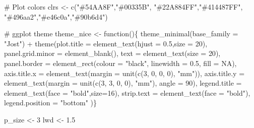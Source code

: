 \documentclass[
  letterpaper,
  DIV=11,
  numbers=noendperiod]{scrartcl}
\newenvironment{Shaded}{\begin{snugshade}}{\end{snugshade}}
\newcommand{\AttributeTok}[1]{\textcolor[rgb]{0.40,0.45,0.13}{#1}}
\newcommand{\CommentTok}[1]{\textcolor[rgb]{0.37,0.37,0.37}{#1}}
\newcommand{\ConstantTok}[1]{\textcolor[rgb]{0.56,0.35,0.01}{#1}}
\newcommand{\ControlFlowTok}[1]{\textcolor[rgb]{0.00,0.23,0.31}{#1}}
\newcommand{\DecValTok}[1]{\textcolor[rgb]{0.68,0.00,0.00}{#1}}
\newcommand{\FloatTok}[1]{\textcolor[rgb]{0.68,0.00,0.00}{#1}}
\newcommand{\FunctionTok}[1]{\textcolor[rgb]{0.28,0.35,0.67}{#1}}
\newcommand{\NormalTok}[1]{\textcolor[rgb]{0.00,0.23,0.31}{#1}}
\newcommand{\OtherTok}[1]{\textcolor[rgb]{0.00,0.23,0.31}{#1}}
\newcommand{\SpecialCharTok}[1]{\textcolor[rgb]{0.37,0.37,0.37}{#1}}
\newcommand{\StringTok}[1]{\textcolor[rgb]{0.13,0.47,0.30}{#1}}
\begin{document}
\begin{Shaded}
\begin{Highlighting}[]
\CommentTok{\# Plot colors}
\NormalTok{clrs }\OtherTok{\textless{}{-}} \FunctionTok{c}\NormalTok{(}\StringTok{"\#54AA8F"}\NormalTok{,}\StringTok{"\#00335B"}\NormalTok{,}
          \StringTok{"\#22A884FF"}\NormalTok{,}\StringTok{"\#414487FF"}\NormalTok{,}
          \StringTok{"\#496aa2"}\NormalTok{,}\StringTok{"\#e46c0a"}\NormalTok{,}\StringTok{"\#90b6d4"}\NormalTok{)}


\CommentTok{\# ggplot theme}
\NormalTok{theme\_nice }\OtherTok{\textless{}{-}} \ControlFlowTok{function}\NormalTok{()\{}
  \FunctionTok{theme\_minimal}\NormalTok{(}\AttributeTok{base\_family =} \StringTok{"Jost"}\NormalTok{) }\SpecialCharTok{+}  
    \FunctionTok{theme}\NormalTok{(}\AttributeTok{plot.title       =} \FunctionTok{element\_text}\NormalTok{(}\AttributeTok{hjust =} \FloatTok{0.5}\NormalTok{,}\AttributeTok{size =} \DecValTok{20}\NormalTok{),}
          \AttributeTok{panel.grid.minor =} \FunctionTok{element\_blank}\NormalTok{(),}
          \AttributeTok{text             =} \FunctionTok{element\_text}\NormalTok{(}\AttributeTok{size  =} \DecValTok{20}\NormalTok{),}
          \AttributeTok{panel.border     =} \FunctionTok{element\_rect}\NormalTok{(}\AttributeTok{colour =} \StringTok{"black"}\NormalTok{, }\AttributeTok{linewidth =} \FloatTok{0.5}\NormalTok{, }\AttributeTok{fill =} \ConstantTok{NA}\NormalTok{),}
          \AttributeTok{axis.title.x     =} \FunctionTok{element\_text}\NormalTok{(}\AttributeTok{margin =} \FunctionTok{unit}\NormalTok{(}\FunctionTok{c}\NormalTok{(}\DecValTok{3}\NormalTok{, }\DecValTok{0}\NormalTok{, }\DecValTok{0}\NormalTok{, }\DecValTok{0}\NormalTok{), }\StringTok{"mm"}\NormalTok{)),}
          \AttributeTok{axis.title.y     =} \FunctionTok{element\_text}\NormalTok{(}\AttributeTok{margin =} \FunctionTok{unit}\NormalTok{(}\FunctionTok{c}\NormalTok{(}\DecValTok{3}\NormalTok{, }\DecValTok{3}\NormalTok{, }\DecValTok{0}\NormalTok{, }\DecValTok{0}\NormalTok{), }\StringTok{"mm"}\NormalTok{), }\AttributeTok{angle =} \DecValTok{90}\NormalTok{),}
          \AttributeTok{legend.title     =} \FunctionTok{element\_text}\NormalTok{(}\AttributeTok{face =} \StringTok{"bold"}\NormalTok{,}\AttributeTok{size=}\DecValTok{16}\NormalTok{),}
          \AttributeTok{strip.text       =} \FunctionTok{element\_text}\NormalTok{(}\AttributeTok{face =} \StringTok{"bold"}\NormalTok{),}
          \AttributeTok{legend.position  =} \StringTok{"bottom"}
\NormalTok{    )\}}

\NormalTok{p\_size }\OtherTok{\textless{}{-}} \DecValTok{3}
\NormalTok{lwd    }\OtherTok{\textless{}{-}} \FloatTok{1.5}
\end{Highlighting}
\end{Shaded}
\end{document}
